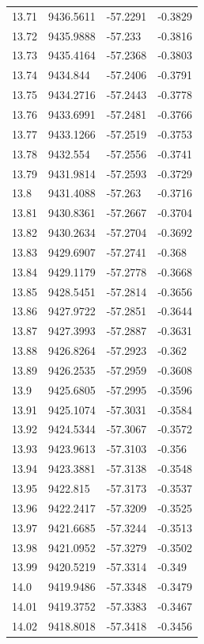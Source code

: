\begin{table}[H]
\begin{tabular}{llll}
13.71 & 9436.5611 & -57.2291 & -0.3829 \\
13.72 & 9435.9888 & -57.233 & -0.3816 \\
13.73 & 9435.4164 & -57.2368 & -0.3803 \\
13.74 & 9434.844 & -57.2406 & -0.3791 \\
13.75 & 9434.2716 & -57.2443 & -0.3778 \\
13.76 & 9433.6991 & -57.2481 & -0.3766 \\
13.77 & 9433.1266 & -57.2519 & -0.3753 \\
13.78 & 9432.554 & -57.2556 & -0.3741 \\
13.79 & 9431.9814 & -57.2593 & -0.3729 \\
13.8 & 9431.4088 & -57.263 & -0.3716 \\
13.81 & 9430.8361 & -57.2667 & -0.3704 \\
13.82 & 9430.2634 & -57.2704 & -0.3692 \\
13.83 & 9429.6907 & -57.2741 & -0.368 \\
13.84 & 9429.1179 & -57.2778 & -0.3668 \\
13.85 & 9428.5451 & -57.2814 & -0.3656 \\
13.86 & 9427.9722 & -57.2851 & -0.3644 \\
13.87 & 9427.3993 & -57.2887 & -0.3631 \\
13.88 & 9426.8264 & -57.2923 & -0.362 \\
13.89 & 9426.2535 & -57.2959 & -0.3608 \\
13.9 & 9425.6805 & -57.2995 & -0.3596 \\
13.91 & 9425.1074 & -57.3031 & -0.3584 \\
13.92 & 9424.5344 & -57.3067 & -0.3572 \\
13.93 & 9423.9613 & -57.3103 & -0.356 \\
13.94 & 9423.3881 & -57.3138 & -0.3548 \\
13.95 & 9422.815 & -57.3173 & -0.3537 \\
13.96 & 9422.2417 & -57.3209 & -0.3525 \\
13.97 & 9421.6685 & -57.3244 & -0.3513 \\
13.98 & 9421.0952 & -57.3279 & -0.3502 \\
13.99 & 9420.5219 & -57.3314 & -0.349 \\
14.0 & 9419.9486 & -57.3348 & -0.3479 \\
14.01 & 9419.3752 & -57.3383 & -0.3467 \\
14.02 & 9418.8018 & -57.3418 & -0.3456 \\

\end{tabular}
\end{table}
